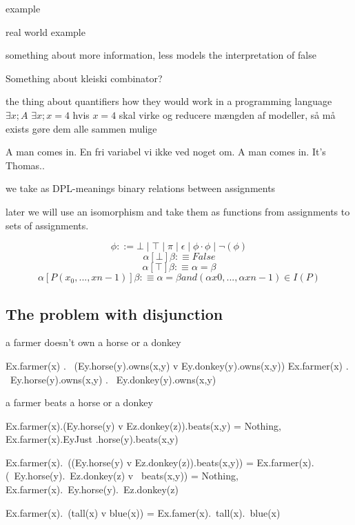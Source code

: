 \documentclass[12pt]{article}
\begin{document}
example

real world example

something about more information, less models
the interpretation of false

Something about kleiski combinator?

the thing about quantifiers
how they would work in a programming language
$\exists x; A$
$\exists x; x = 4$ hvis $x=4$ skal virke og reducere mængden af modeller, så må exists gøre dem alle sammen mulige

A man comes in. En fri variabel vi ikke ved noget om.
A man comes in. It's Thomas..

we take as DPL-meanings binary relations between assignments

later we will use an isomorphism and take them as functions from assignments to sets of assignments.

\begin{equation}
\phi ::= \bot \mid \top \mid \pi \mid \epsilon \mid \phi \cdot \phi \mid \lnot(\phi)
\end{equation}
\begin{equation}
\alpha [\bot] \beta :\equiv False
\end{equation}
\begin{equation}
\alpha [\top] \beta :\equiv \alpha = \beta
\end{equation}
\begin{equation}
\alpha[P(x_0, ..., xn-1)]\beta :\equiv \alpha = \beta and (\alpha x0, ..., \alpha x n-1 ) \in I(P)
\end{equation}

\subsection{The problem with disjunction}


a farmer doesn't own a horse or a donkey

Ex.farmer(x) . ~(Ey.horse(y).owns(x,y) v Ey.donkey(y).owns(x,y))
Ex.farmer(x) . ~Ey.horse(y).owns(x,y) . ~Ey.donkey(y).owns(x,y)

a farmer beats a horse or a donkey

Ex.farmer(x).(Ey.horse(y) v Ez.donkey(z)).beats(x,y) = {Nothing, Ex.farmer(x).EyJust .horse(y).beats(x,y)}

Ex.farmer(x).~((Ey.horse(y) v Ez.donkey(z)).beats(x,y)) =
Ex.farmer(x).(~Ey.horse(y).~Ez.donkey(z) v ~beats(x,y)) = {Nothing, Ex.farmer(x).~Ey.horse(y).~Ez.donkey(z)}

Ex.farmer(x).~(tall(x) v blue(x)) = Ex.famer(x).~tall(x).~blue(x)
\end{document}
